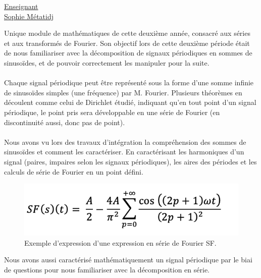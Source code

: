 \renewcommand{\figurename}{}

\vspace*{0.2cm}%
      \large
      \href{}{\color{black}Enseignant\\Sophie Métatidj}\\%
      \normalsize
\vspace*{0.5cm}%

Unique module de mathématiques de cette deuxième année, consacré aux séries et aux transformés de Fourier. Son objectif lors de cette deuxième période était de nous familiariser avec la décomposition de signaux périodiques en sommes de sinusoïdes, et de pouvoir correctement les manipuler pour la suite.
\\ \\
Chaque signal périodique peut être représenté sous la forme d'une somme infinie de sinusoïdes simples (une fréquence) par M. Fourier. Plusieurs théorèmes en découlent comme celui de Dirichlet étudié, indiquant qu'en tout point d'un signal périodique, le point pris sera développable en une série de Fourier (en discontinuité aussi, donc pas de point).
\\ \\
Nous avons vu lors des travaux d'intégration la compréhension des sommes de sinusoïdes et comment les caractériser. En caractérisant les harmoniques d'un signal (paires, impaires selon les signaux périodiques), les aires des périodes et les calculs de série de Fourier en un point défini.

\begin{figure}[H]
    \centering
    \includegraphics[width=\textwidth - \textwidth / 2]{ressources/r314/00.png}
    \caption{Exemple d'expression d'une expression en série de Fourier SF.}
    \label{fig:r314-00}
\end{figure}

Nous avons aussi caractérisé mathématiquement un signal périodique par le biai de questions pour nous familiariser avec la décomposition en série.

